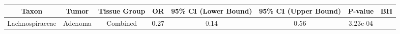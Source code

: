 \documentclass[12pt,]{article}
\begin{document}
\scriptsize

\begin{longtable}[]{@{}cccccccc@{}}
\toprule
\begin{minipage}[b]{0.18\columnwidth}\centering\strut
Taxon\strut
\end{minipage} & \begin{minipage}[b]{0.07\columnwidth}\centering\strut
Tumor\strut
\end{minipage} & \begin{minipage}[b]{0.09\columnwidth}\centering\strut
Tissue Group\strut
\end{minipage} & \begin{minipage}[b]{0.03\columnwidth}\centering\strut
OR\strut
\end{minipage} & \begin{minipage}[b]{0.14\columnwidth}\centering\strut
95\% CI (Lower Bound)\strut
\end{minipage} & \begin{minipage}[b]{0.14\columnwidth}\centering\strut
95\% CI (Upper Bound)\strut
\end{minipage} & \begin{minipage}[b]{0.06\columnwidth}\centering\strut
P-value\strut
\end{minipage} & \begin{minipage}[b]{0.06\columnwidth}\centering\strut
BH\strut
\end{minipage}\tabularnewline
\midrule
\endhead
\begin{minipage}[t]{0.18\columnwidth}\centering\strut
Lachnospiraceae\strut
\end{minipage} & \begin{minipage}[t]{0.07\columnwidth}\centering\strut
Adenoma\strut
\end{minipage} & \begin{minipage}[t]{0.09\columnwidth}\centering\strut
Combined\strut
\end{minipage} & \begin{minipage}[t]{0.03\columnwidth}\centering\strut
0.27\strut
\end{minipage} & \begin{minipage}[t]{0.14\columnwidth}\centering\strut
0.14\strut
\end{minipage} & \begin{minipage}[t]{0.14\columnwidth}\centering\strut
0.56\strut
\end{minipage} & \begin{minipage}[t]{0.06\columnwidth}\centering\strut
3.23e-04\strut

\end{minipage}
\end{longtable}
\end{document}
